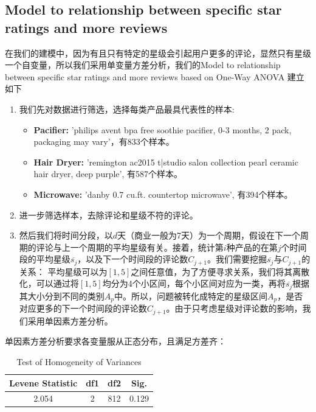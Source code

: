 \documentclass{mcmthesis}
\begin{document}
\subsection{Model to relationship between specific star ratings and more reviews}
在我们的建模中，因为有且只有特定的星级会引起用户更多的评论，显然只有星级一个自变量，所以我们采用单变量方差分析，我们的Model to relationship between specific star ratings and more reviews based on One-Way ANOVA 建立如下\\
\begin{enumerate}
	\item 我们先对数据进行筛选，选择每类产品最具代表性的样本:
	\begin{itemize}
		\item \textbf{Pacifier: }'philips avent bpa free soothie pacifier, 0-3 months, 2 pack, packaging may vary'，有833个样本。
		\item \textbf{Hair Dryer: }'remington ac2015 t|studio salon collection pearl ceramic hair dryer, deep purple', 有587个样本。
		\item \textbf{Microwave: }'danby 0.7 cu.ft. countertop microwave', 有394个样本。
	\end{itemize}
	\item 进一步筛选样本，去除评论和星级不符的评论。
	\item 然后我们将时间分段，以$d$天（商业一般为7天）为一个周期，假设在下一个周期的评论与上一个周期的平均星级有关。接着，统计第$i$种产品的在第$j$个时间段的平均星级$\overline{s_j}$，以及下一个时间段的评论数$C_{j+1}$。我们需要挖掘$\overline{s_j}$与$C_{j+1}$的关系：
	平均星级可以为$[1,5]$之间任意值，为了方便寻求关系，我们将其离散化，可以通过将$[1,5]$均分为4个小区间，每个小区间对应为一类，再将$\overline{s_j}$根据其大小分到不同的类别$A_p$中。所以，问题被转化成特定的星级区间$A_p$，是否对应更多的下一个时间段的评论数$C_{j+1}$。由于只考虑星级对评论数的影响，我们采用单因素方差分析。
\end{enumerate}
单因素方差分析要求各变量服从正态分布，且满足方差齐：\\
\begin{table}[htb]
	\center
	\caption{Test of Homogeneity of Variances}
	\label{type}
	\begin{tabular}{c|c|c|c}
		\hline
		\textbf{Levene Statistic} & \textbf{df1}& \textbf{df2}& \textbf{Sig.} \\ \hline 
		2.054                     & 2           & 812         & 0.129         \\ \hline
	\end{tabular}
\end{table}
\end{document}
